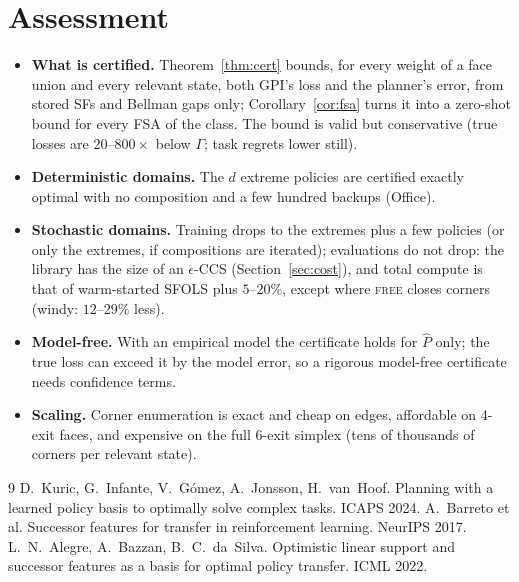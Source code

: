 \documentclass[11pt]{article}
\theoremstyle{definition}
\begin{document}
\section{Assessment}
\begin{itemize}
\item \textbf{What is certified.} Theorem~\ref{thm:cert} bounds, for every weight of a face union and every relevant
state, both GPI's loss and the planner's error, from stored SFs and Bellman gaps only; Corollary~\ref{cor:fsa} turns it
into a zero-shot bound for every FSA of the class. The bound is valid but conservative (true losses are $20$--$800\times$
below $\Gamma$; task regrets lower still).
\item \textbf{Deterministic domains.} The $d$ extreme policies are certified exactly optimal with no composition and a
few hundred backups (Office).
\item \textbf{Stochastic domains.} Training drops to the extremes plus a few policies (or only the extremes, if
compositions are iterated); evaluations do not drop: the library has the size of an $\epsilon$-CCS
(Section~\ref{sec:cost}), and total compute is that of warm-started SFOLS plus $5$--$20\%$, except where \textsc{free}
closes corners (windy: $12$--$29\%$ less).
\item \textbf{Model-free.} With an empirical model the certificate holds for $\hat P$ only; the true loss can exceed it
by the model error, so a rigorous model-free certificate needs confidence terms.
\item \textbf{Scaling.} Corner enumeration is exact and cheap on edges, affordable on 4-exit faces, and expensive on the
full 6-exit simplex (tens of thousands of corners per relevant state).
\end{itemize}

\begin{thebibliography}{9}
 D.~Kuric, G.~Infante, V.~G\'omez, A.~Jonsson, H.~van~Hoof. Planning with a learned policy
basis to optimally solve complex tasks. ICAPS 2024.
 A.~Barreto et al. Successor features for transfer in reinforcement learning. NeurIPS 2017.
 L.~N.~Alegre, A.~Bazzan, B.~C.~da~Silva. Optimistic linear support and successor features
as a basis for optimal policy transfer. ICML 2022.
\end{thebibliography}
\end{document}
